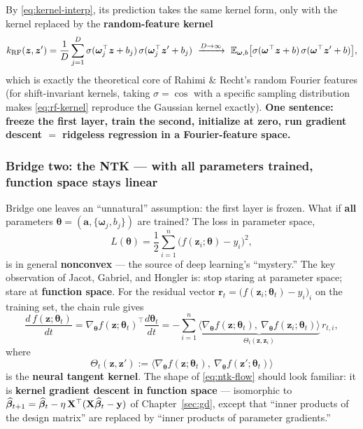 By \eqref{eq:kernel-interp}, its prediction takes the same kernel form, only with the kernel replaced by the \textbf{random-feature kernel}
\begin{equation}\label{eq:rf-kernel}
  k_{\mathrm{RF}}(\bm{z}, \bm{z}') = \frac{1}{D}\sum_{j=1}^D \sigma(\bm{\omega}_j^\top\bm{z}+b_j)\,\sigma(\bm{\omega}_j^\top\bm{z}'+b_j)
  \ \xrightarrow{D \to \infty}\ \mathbb{E}_{\bm{\omega}, b}\big[ \sigma(\bm{\omega}^\top\bm{z} + b)\,\sigma(\bm{\omega}^\top\bm{z}' + b) \big],
\end{equation}
which is exactly the theoretical core of Rahimi \& Recht's random Fourier features (for shift-invariant kernels, taking $\sigma = \cos$ with a specific sampling distribution makes \eqref{eq:rf-kernel} reproduce the Gaussian kernel exactly)\cite{rahimi2007}. \textbf{One sentence: freeze the first layer, train the second, initialize at zero, run gradient descent $=$ ridgeless regression in a Fourier-feature space.}

\subsubsection*{Bridge two: the NTK --- with all parameters trained, function space stays linear}

Bridge one leaves an ``unnatural'' assumption: the first layer is frozen. What if \textbf{all} parameters $\bm{\theta} = (\bm{a}, \{ \bm{\omega}_j, b_j \})$ are trained? The loss in parameter space,
\[
  L(\bm{\theta}) = \frac{1}{2}\sum_{i=1}^n \big( f(\bm{z}_i; \bm{\theta}) - y_i \big)^2,
\]
is in general \textbf{nonconvex} --- the source of deep learning's ``mystery.'' The key observation of Jacot, Gabriel, and Hongler is: stop staring at parameter space; stare at \textbf{function space}. For the residual vector $\bm{r}_t = \big( f(\bm{z}_i; \bm{\theta}_t) - y_i \big)_i$ on the training set, the chain rule gives
\begin{equation}\label{eq:ntk-flow}
  \frac{d\, f(\bm{z}; \bm{\theta}_t)}{dt}
  = \nabla_{\bm{\theta}} f(\bm{z}; \bm{\theta}_t)^\top \frac{d\bm{\theta}_t}{dt}
  = -\sum_{i=1}^n \underbrace{\big\langle \nabla_{\bm{\theta}} f(\bm{z}; \bm{\theta}_t),\ \nabla_{\bm{\theta}} f(\bm{z}_i; \bm{\theta}_t) \big\rangle}_{\Theta_t(\bm{z}, \bm{z}_i)} \, r_{t,i} ,
\end{equation}
where
\begin{equation}\label{eq:ntk-def}
  \Theta_t(\bm{z}, \bm{z}') := \big\langle \nabla_{\bm{\theta}} f(\bm{z}; \bm{\theta}_t),\ \nabla_{\bm{\theta}} f(\bm{z}'; \bm{\theta}_t) \big\rangle
\end{equation}
is the \textbf{neural tangent kernel}. The shape of \eqref{eq:ntk-flow} should look familiar: it is \textbf{kernel gradient descent in function space} --- isomorphic to $\widehat{\bm{\beta}}_{t+1} = \widehat{\bm{\beta}}_t - \eta\,\mathbf{X}^\top(\mathbf{X}\widehat{\bm{\beta}}_t - \mathbf{y})$ of Chapter~\ref{sec:gd}, except that ``inner products of the design matrix'' are replaced by ``inner products of parameter gradients.''


